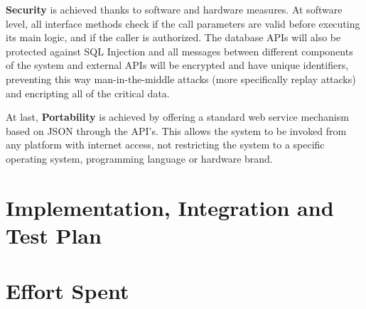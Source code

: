 \documentclass[12pt]{article}
\begin{document}
\textbf{Security} is achieved thanks to software and hardware measures. At software level, all interface methods check if the call parameters are valid before executing its main logic, and if the caller is authorized. The database APIs will also be protected against SQL Injection and all messages between different components of the system and external APIs will be encrypted and have unique identifiers, preventing this way man-in-the-middle attacks (more specifically replay attacks) and encripting all of the critical data.

At last, \textbf{Portability} is achieved by offering a standard web service mechanism based on JSON through the API's. This allows the system to be invoked from any platform with internet access, not restricting the system to a specific operating system, programming language or hardware brand.

\section{Implementation, Integration and Test Plan}

\section{Effort Spent}
\end{document}
